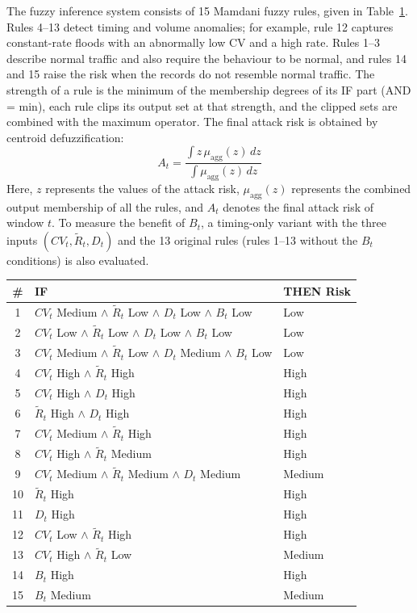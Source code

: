 \documentclass[]{interact}
\theoremstyle{plain}%
\theoremstyle{definition}
\theoremstyle{remark}
\begin{document}
The fuzzy inference system consists of 15 Mamdani fuzzy rules, given in Table~\ref{tab:rules}. Rules 4--13 detect timing and volume anomalies; for example, rule 12 captures constant-rate floods with an abnormally low CV and a high rate. Rules 1--3 describe normal traffic and also require the behaviour to be normal, and rules 14 and 15 raise the risk when the records do not resemble normal traffic. The strength of a rule is the minimum of the membership degrees of its IF part (AND = min), each rule clips its output set at that strength, and the clipped sets are combined with the maximum operator. The final attack risk is obtained by centroid defuzzification:
\begin{equation}
  A_t = \frac{\int z\,\mu_{\mathrm{agg}}(z)\,dz}{\int \mu_{\mathrm{agg}}(z)\,dz}
\end{equation}
Here, $z$ represents the values of the attack risk, $\mu_{\mathrm{agg}}(z)$ represents the combined output membership of all the rules, and $A_t$ denotes the final attack risk of window $t$. To measure the benefit of $B_t$, a timing-only variant with the three inputs $(CV_t, \tilde{R}_t, D_t)$ and the 13 original rules (rules 1--13 without the $B_t$ conditions) is also evaluated.

\begin{table}[htbp]
{\begin{tabular}{cll}
\toprule
\# & IF & THEN Risk \\
\midrule
1  & $CV_t$ Medium $\wedge$ $\tilde{R}_t$ Low $\wedge$ $D_t$ Low $\wedge$ $B_t$ Low & Low \\
2  & $CV_t$ Low $\wedge$ $\tilde{R}_t$ Low $\wedge$ $D_t$ Low $\wedge$ $B_t$ Low & Low \\
3  & $CV_t$ Medium $\wedge$ $\tilde{R}_t$ Low $\wedge$ $D_t$ Medium $\wedge$ $B_t$ Low & Low \\
4  & $CV_t$ High $\wedge$ $\tilde{R}_t$ High & High \\
5  & $CV_t$ High $\wedge$ $D_t$ High & High \\
6  & $\tilde{R}_t$ High $\wedge$ $D_t$ High & High \\
7  & $CV_t$ Medium $\wedge$ $\tilde{R}_t$ High & High \\
8  & $CV_t$ High $\wedge$ $\tilde{R}_t$ Medium & High \\
9  & $CV_t$ Medium $\wedge$ $\tilde{R}_t$ Medium $\wedge$ $D_t$ Medium & Medium \\
10 & $\tilde{R}_t$ High & High \\
11 & $D_t$ High & High \\
12 & $CV_t$ Low $\wedge$ $\tilde{R}_t$ High & High \\
13 & $CV_t$ High $\wedge$ $\tilde{R}_t$ Low & Medium \\
14 & $B_t$ High & High \\
15 & $B_t$ Medium & Medium \\
\bottomrule
\end{tabular}}
\label{tab:rules}
\end{table}
\end{document}
